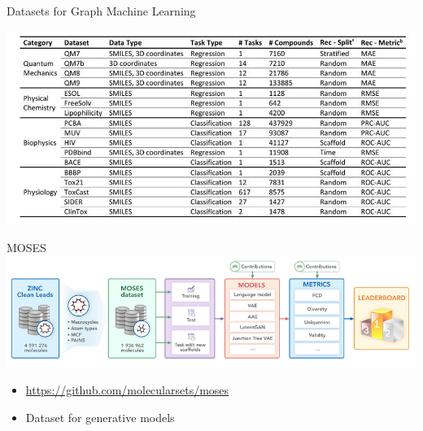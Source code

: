 \documentclass[11pt]{beamer}
\begin{document}
\begin{frame}[allowframebreaks] {Datasets for Graph Machine Learning}
{    \vspace{.3cm}
    \includegraphics[width=\textwidth]{moleculenet_overview}

  }
  

\break

  \begin{block}{MOSES}
    \includegraphics[width=\textwidth]{moses}
    \begin{itemize}
    \item \url{https://github.com/molecularsets/moses}
    \item Dataset for generative models 
    \end{itemize}
  \end{block}
\end{frame}
\end{document}
